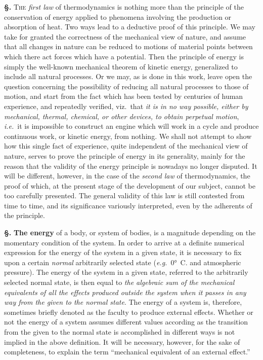\documentclass[12pt]{book}[2005/09/16]
\newcommand{\Section}[1]{
  \medskip\par\textbf{§\;#1}
  \label{section:#1}
}
\newcommand{\PageSep}[1]{\ignorespaces}
\newcommand{\Topic}[1]{\textbf{#1}}
\newcommand{\eg}{\emph{e.g.}}
\newcommand{\ie}{\emph{i.e.}}
\newcommand{\First}[1]{\textsc{#1}}
\begin{document}
\Section{55.} \First{The} \emph{first law} of thermodynamics is nothing more
than the principle of the conservation of energy applied
%
%
to phenomena involving the production or absorption of
heat. Two ways lead to a deductive proof of this principle.
We may take for granted the correctness of the mechanical
view of nature, and assume that all changes in nature can
be reduced to motions of material points between which
there act forces which have a potential. Then the principle
of energy is simply the well-known mechanical theorem of
kinetic energy, generalized to include all natural processes.
Or we may, as is done in this work, leave open the question
concerning the possibility of reducing all natural processes
to those of motion, and start from the fact which has been
tested by centuries of human experience, and repeatedly
verified, viz.\ that \emph{it is in no way possible, either by mechanical,
thermal, chemical, or other devices, to obtain perpetual motion},
\ie\ it is impossible to construct an engine which will work
in a cycle and produce continuous work, or kinetic energy,
from nothing. We shall not attempt to show how this single
fact of experience, quite independent of the mechanical
view of nature, serves to prove the principle of energy in
its generality, mainly for the reason that the validity of
the energy principle is nowadays no longer disputed. It
\PageSep{39}
will be different, however, in the case of the \emph{second law} of
thermodynamics, the proof of which, at the present stage
of the development of our subject, cannot be too carefully
presented. The general validity of this law is still contested
from time to time, and its significance variously
interpreted, even by the adherents of the principle.

\Section{56.} \Topic{The energy} of a body, or system of bodies, is
%
%
a magnitude depending on the momentary condition of
the system. In order to arrive at a definite numerical
expression for the energy of the system in a given state,
it is necessary to fix upon a certain \emph{normal} arbitrarily
selected state (\eg\ $0°$~C. and atmospheric pressure). The
energy of the system in a given state, referred to the
arbitrarily selected normal state, is then equal to \emph{the algebraic
sum of the mechanical equivalents of all the effects
produced outside the system when it passes in any way from
the given to the normal state}. The energy of a system is,
therefore, sometimes briefly denoted as the faculty to
produce external effects. Whether or not the energy of a
system assumes different values according as the transition
from the given to the normal state is accomplished in
different ways is not implied in the above definition. It
will be necessary, however, for the sake of completeness,
to explain the term ``mechanical equivalent of an external
effect.''
\end{document}
